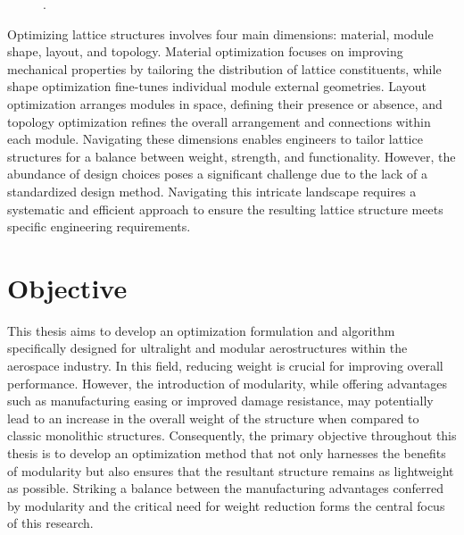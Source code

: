 \begin{figure}
    \hspace*{\fill}
    \hfill
    \hspace*{\fill}
    \caption{\cite{cheung_reversibly_2013} \cite{costa_algorithmic_2020}.}
    \label{fig:01_fab}
\end{figure}

Optimizing lattice structures involves four main dimensions: material, module shape, layout, and topology. Material optimization focuses on improving mechanical properties by tailoring the distribution of lattice constituents, while shape optimization fine-tunes individual module external geometries. Layout optimization arranges modules in space, defining their presence or absence, and topology optimization refines the overall arrangement and connections within each module. Navigating these dimensions enables engineers to tailor lattice structures for a balance between weight, strength, and functionality. However, the abundance of design choices poses a significant challenge due to the lack of a standardized design method. Navigating this intricate landscape requires a systematic and efficient approach to ensure the resulting lattice structure meets specific engineering requirements. 

\section*{Objective}
This thesis aims to develop an optimization formulation and algorithm specifically designed for ultralight and modular aerostructures within the aerospace industry. In this field, reducing weight is crucial for improving overall performance. However, the introduction of modularity, while offering advantages such as manufacturing easing or improved damage resistance, may potentially lead to an increase in the overall weight of the structure when compared to classic monolithic structures. Consequently, the primary objective throughout this thesis is to develop an optimization method that not only harnesses the benefits of modularity but also ensures that the resultant structure remains as lightweight as possible. Striking a balance between the manufacturing advantages conferred by modularity and the critical need for weight reduction forms the central focus of this research.

